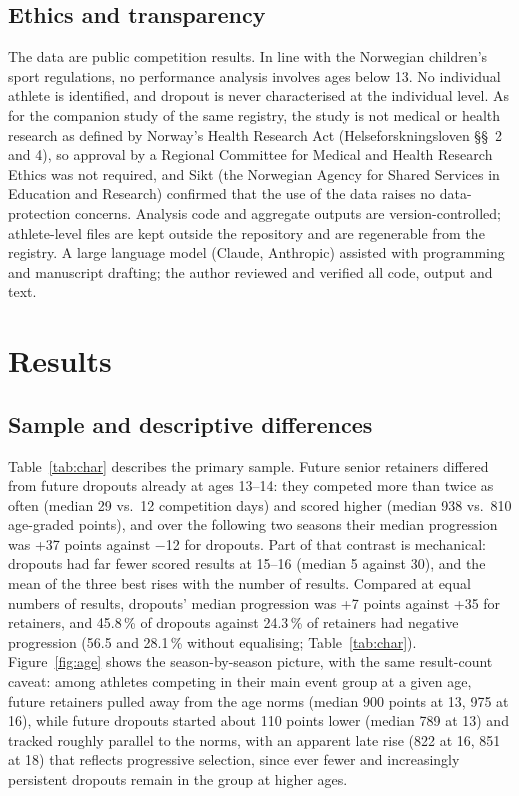 \documentclass[12pt,a4paper]{article}
\begin{document}
\subsection{Ethics and transparency}

The data are public competition results. In line with the Norwegian children's sport regulations, no performance analysis involves ages below 13. No individual athlete is identified, and dropout is never characterised at the individual level. As for the companion study of the same registry, the study is not medical or health research as defined by Norway's Health Research Act (Helseforskningsloven \S\S~2 and 4), so approval by a Regional Committee for Medical and Health Research Ethics was not required, and Sikt (the Norwegian Agency for Shared Services in Education and Research) confirmed that the use of the data raises no data-protection concerns. Analysis code and aggregate outputs are version-controlled; athlete-level files are kept outside the repository and are regenerable from the registry. A large language model (Claude, Anthropic) assisted with programming and manuscript drafting; the author reviewed and verified all code, output and text.

\section{Results}

\subsection{Sample and descriptive differences}

Table~\ref{tab:char} describes the primary sample. Future senior retainers differed from future dropouts already at ages 13--14: they competed more than twice as often (median 29 vs.\ 12 competition days) and scored higher (median 938 vs.\ 810 age-graded points), and over the following two seasons their median progression was +37 points against $-$12 for dropouts. Part of that contrast is mechanical: dropouts had far fewer scored results at 15--16 (median 5 against 30), and the mean of the three best rises with the number of results. Compared at equal numbers of results, dropouts' median progression was +7 points against +35 for retainers, and 45.8\,\% of dropouts against 24.3\,\% of retainers had negative progression (56.5 and 28.1\,\% without equalising; Table~\ref{tab:char}). Figure~\ref{fig:age} shows the season-by-season picture, with the same result-count caveat: among athletes competing in their main event group at a given age, future retainers pulled away from the age norms (median 900 points at 13, 975 at 16), while future dropouts started about 110 points lower (median 789 at 13) and tracked roughly parallel to the norms, with an apparent late rise (822 at 16, 851 at 18) that reflects progressive selection, since ever fewer and increasingly persistent dropouts remain in the group at higher ages.
\end{document}
